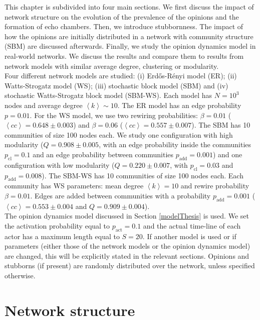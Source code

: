 \documentclass[11 pt , letterpaper , twoside , openright]{book}
\begin{document}
This chapter is subdivided into four main sections. We first discuss the impact of network structure on the evolution of the prevalence of the opinions and the formation of echo chambers. Then, we introduce stubbornness. The impact of how the opinions are initially distributed in a network with community structure (SBM) are discussed afterwards. Finally, we study the opinion dynamics model in real-world networks. We discuss the results and compare them to results from network models with similar average degree, clustering or modularity.\\
\newline
Four different network models are studied: (i) Erd\H{o}s-R\'{e}nyi model (ER); (ii) Watts-Strogatz model (WS); (iii) stochastic block model (SBM) and (iv) stochastic Watts-Strogatz block model (SBM-WS). Each model has $N = 10^3$ nodes and average degree $\left<k\right> \sim 10$. The ER model has an edge probability $p = 0.01$. For the WS model, we use two rewiring probabilities: $\beta = 0.01$ ($\left<cc\right> = 0.648 \pm 0.003$) and $\beta = 0.06$ ($\left<cc\right> = 0.557 \pm 0.007$). The SBM has 10 communities of size 100 nodes each. We study one configuration with high modularity ($Q = 0.908 \pm 0.005$, with an edge probability inside the communities $p_{\text{cl}} = 0.1$ and an edge probability between communities $p_{\text{add}} = 0.001$) and one configuration with low modularity ($Q = 0.220 \pm 0.007$, with $p_{\text{cl}} = 0.03$ and $p_{\text{add}} = 0.008$). The SBM-WS has 10 communities of size 100 nodes each. Each community has WS parameters: mean degree $\left<k\right> =10$ and rewire probability $\beta = 0.01$. Edges are added between communities with a probability $p_{\text{add}} = 0.001$ ($\left<cc\right> = 0.553 \pm 0.004$ and $Q = 0.909 \pm 0.004$).\\
\newline
The opinion dynamics model discussed in Section \ref{modelThesis} is used. We set the activation probability equal to $p_{\text{act}} = 0.1$ and the actual time-line of each actor has a maximum length equal to $S=20$. If another model is used or if parameters (either those of the network models or the opinion dynamics model) are changed, this will be explicitly stated in the relevant sections. Opinions and stubborns (if present) are randomly distributed over the network, unless specified otherwise.

\section{Network structure}\label{netw_struc}
\end{document}
